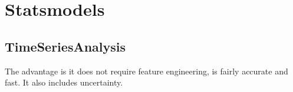 \chapter{Statsmodels}


\section{TimeSeriesAnalysis}

The advantage is it does not require feature engineering, is fairly accurate and fast. It also includes uncertainty.